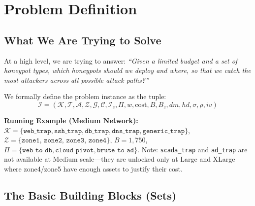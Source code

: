 \documentclass[journal]{IEEEtran}
\newcommand{\calK}{\mathcal{K}}
\newcommand{\calT}{\mathcal{T}}
\newcommand{\calA}{\mathcal{A}}
\newcommand{\calZ}{\mathcal{Z}}
\newcommand{\calG}{\mathcal{G}}
\newcommand{\calC}{\mathcal{C}}
\newcommand{\calPi}{\mathcal{\Pi}}
\begin{document}
\section{Problem Definition}
\label{sec:problem}

\subsection{What We Are Trying to Solve}

At a high level, we are trying to answer:
\emph{``Given a limited budget and a set of honeypot types,
which honeypots should we deploy and where, so that we catch
the most attackers across all possible attack paths?''}

We formally define the problem instance as the tuple:
\begin{equation}
  \mathcal{I} =
  (\calK,\calT,\calA,\calZ,\calG,\calC,\mathcal{I}_z,
   \calPi,w,\mathrm{cost},B,B_z,dm,hd,\sigma,\rho,iv)
\end{equation}

\begin{examplebox}
\textbf{Running Example (Medium Network):}
$\calK = \{\texttt{web\_trap}, \texttt{ssh\_trap},
\texttt{db\_trap}, \texttt{dns\_trap},
\texttt{generic\_trap}\}$,
$\calZ = \{\texttt{zone1, zone2, zone3, zone4}\}$,
$B = 1{,}750$,
$\calPi = \{\texttt{web\_to\_db}, \texttt{cloud\_pivot},
\texttt{brute\_to\_ad}\}$.
Note: \texttt{scada\_trap} and \texttt{ad\_trap} are not
available at Medium scale---they are unlocked only at Large
and XLarge where zone4/zone5 have enough assets to justify
their cost.
\end{examplebox}

\subsection{The Basic Building Blocks (Sets)}
\end{document}
